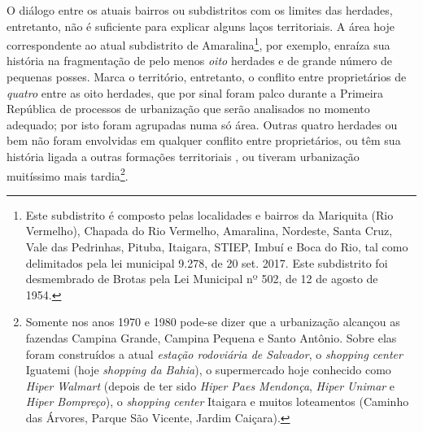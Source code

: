 O diálogo entre os atuais bairros ou subdistritos com os limites das herdades, entretanto, não é suficiente para explicar alguns laços territoriais. A área hoje correspondente ao atual subdistrito de Amaralina\footnote{Este subdistrito é composto pelas localidades e bairros da Mariquita (Rio Vermelho), Chapada do Rio Vermelho, Amaralina, Nordeste, Santa Cruz, Vale das Pedrinhas, Pituba, Itaigara, STIEP, Imbuí e Boca do Rio, tal como delimitados pela lei municipal 9.278, de 20 set. 2017. Este subdistrito foi desmembrado de Brotas pela Lei Municipal nº 502, de 12 de agosto de 1954.}, por exemplo, enraíza sua história na fragmentação de pelo menos \textit{oito} herdades e de grande número de pequenas posses. Marca o território, entretanto, o conflito entre proprietários de \textit{quatro} entre as oito herdades, que por sinal foram palco durante a Primeira República de processos de urbanização que serão analisados no momento adequado; por isto foram agrupadas numa só área. Outras quatro herdades ou bem não foram envolvidas em qualquer conflito entre proprietários, ou têm sua história ligada a outras formações territoriais
, ou tiveram urbanização muitíssimo mais tardia\footnote{Somente nos anos 1970 e 1980 pode-se dizer que a urbanização alcançou as fazendas Campina Grande, Campina Pequena e Santo Antônio. Sobre elas foram construídos a atual \textit{estação rodoviária de Salvador}, o \textit{shopping center} Iguatemi (hoje \textit{shopping da Bahia}), o supermercado hoje conhecido como \textit{Hiper Walmart} (depois de ter sido \textit{Hiper Paes Mendonça}, \textit{Hiper Unimar} e \textit{Hiper Bompreço}), o \textit{shopping center} Itaigara e muitos loteamentos (Caminho das Árvores, Parque São Vicente, Jardim Caiçara).}.

